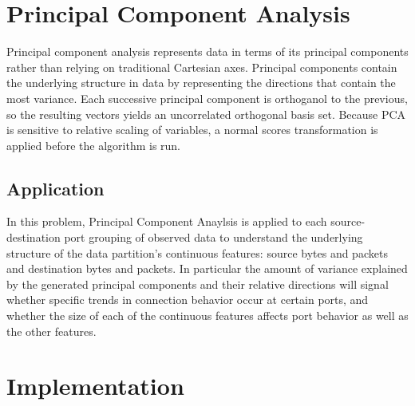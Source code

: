 \documentclass[12pt,twoside]{dukestatscithesis}
\theoremstyle{definition}
\theoremstyle{definition}
\theoremstyle{definition}
\theoremstyle{remark}
\begin{document}
\section{Principal Component
Analysis}\label{principal-component-analysis}

Principal component analysis represents data in terms of its principal
components rather than relying on traditional Cartesian axes. Principal
components contain the underlying structure in data by representing the
directions that contain the most variance. Each successive principal
component is orthoganol to the previous, so the resulting vectors yields
an uncorrelated orthogonal basis set. Because PCA is sensitive to
relative scaling of variables, a normal scores transformation is applied
before the algorithm is run.

\subsection{Application}\label{application}

In this problem, Principal Component Anaylsis is applied to each
source-destination port grouping of observed data to understand the
underlying structure of the data partition's continuous features: source
bytes and packets and destination bytes and packets. In particular the
amount of variance explained by the generated principal components and
their relative directions will signal whether specific trends in
connection behavior occur at certain ports, and whether the size of each
of the continuous features affects port behavior as well as the other
features.

\section{Implementation}\label{implementation}
\end{document}
